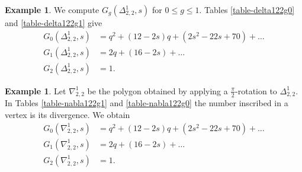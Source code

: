 \documentclass[11pt]{article}
\theoremstyle{definition}
\newtheorem{exam}[theo]{Example}
\numberwithin{equation}{section}
\theoremstyle{plain}
\begin{document}
\begin{exam} \label{ex-delta122}
We compute $G_g(\Delta^1_{2,2},s)$ for $0\leqslant g\leqslant 1$. Tables \ref{table-delta122g0} and \ref{table-delta122g1} give
\begin{align*}
    G_0(\Delta^1_{2,2},s) &= q^2 + (12-2s)q + (2s^2-22s+70) + \dots  \\
    G_1(\Delta^1_{2,2},s) &= 2q + (16-2s) + \dots \\
    G_2(\Delta^1_{2,2},s) &= 1.
\end{align*} 
\end{exam}


\begin{exam} \label{ex-nabla122} 
Let $\nabla^1_{2,2}$ be the polygon obtained by applying a $\frac{\pi}{2}$-rotation to $\Delta^1_{2,2}$. In Tables \ref{table-nabla122g1} and \ref{table-nabla122g0} the number inscribed in a vertex is its divergence. We obtain
\begin{align*}
    G_0(\nabla^1_{2,2},s) &= q^2 + (12-2s)q + (2s^2-22s+70) + \dots \\
    G_1(\nabla^1_{2,2},s) &= 2q + (16-2s) + \dots \\
    G_2(\nabla^1_{2,2},s) &= 1. 
\end{align*}
\end{exam}
\end{document}
